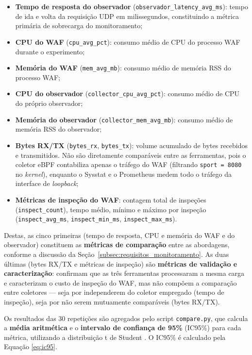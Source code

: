 \begin{itemize}
    \item \textbf{Tempo de resposta do observador} (\texttt{observador\_latency\_avg\_ms}): tempo de ida e volta da requisição UDP em milissegundos, constituindo a métrica primária de sobrecarga do monitoramento;
    \item \textbf{CPU do WAF} (\texttt{cpu\_avg\_pct}): consumo médio de CPU do processo WAF durante o experimento;
    \item \textbf{Memória do WAF} (\texttt{mem\_avg\_mb}): consumo médio de memória RSS do processo WAF;
    \item \textbf{CPU do observador} (\texttt{collector\_cpu\_avg\_pct}): consumo médio de CPU do próprio observador;
    \item \textbf{Memória do observador} (\texttt{collector\_mem\_avg\_mb}): consumo médio de memória RSS do observador;
    \item \textbf{Bytes RX/TX} (\texttt{bytes\_rx}, \texttt{bytes\_tx}): volume acumulado de bytes recebidos e transmitidos. Não são diretamente comparáveis entre as ferramentas, pois o coletor eBPF contabiliza apenas o tráfego do WAF (filtrando \texttt{sport = 8080} no \textit{kernel}), enquanto o Sysstat e o Prometheus medem todo o tráfego da interface de \textit{loopback};
    \item {\raggedright\textbf{Métricas de inspeção do WAF}: contagem total de inspeções (\texttt{inspect\_count}), tempo médio, mínimo e máximo por inspeção (\texttt{inspect\_avg\_ms}, \texttt{inspect\_min\_ms}, \texttt{inspect\_max\_ms}).\par}
\end{itemize}

Destas, as cinco primeiras (tempo de resposta, CPU e memória do WAF e do observador) constituem as \textbf{métricas de comparação} entre as abordagens, conforme a discussão da Seção~\ref{subsec:requisitos_monitoramento}. As duas últimas (bytes RX/TX e métricas de inspeção) são \textbf{métricas de validação e caracterização}: confirmam que as três ferramentas processaram a mesma carga e caracterizam o custo de inspeção do WAF, mas não compõem a comparação entre coletores --- seja por independerem do coletor empregado (tempo de inspeção), seja por não serem mutuamente comparáveis (bytes RX/TX).

Os resultados das 30 repetições são agregados pelo script \texttt{compare.py}, que calcula a \textbf{média aritmética} e o \textbf{intervalo de confiança de 95\%} (IC95\%) para cada métrica, utilizando a distribuição t de Student \cite{marconi2017}. O IC95\% é calculado pela Equação \ref{eq:ic95}.


